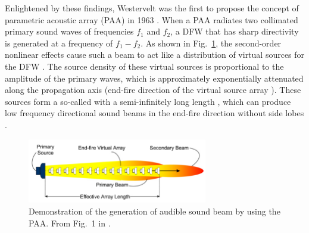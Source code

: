 Enlightened by these findings, Westervelt {was the first to propose} the concept of {parametric acoustic array} (PAA) in 1963 \cite{Westervelt1963ParametricAcousticArray}. 
When a PAA radiates two collimated primary sound waves of frequencies $f_1$ and $f_2$, a DFW that has sharp directivity is generated {at a frequency of $f_1 - f_2$}.
As shown in Fig.~\ref{fig:lr:89fjsd}, 
{the second-order nonlinear effects cause such a beam to act like a distribution of virtual sources for the DFW \cite{Westervelt1960ParametricEndFire}. 
    The source density of these virtual sources is proportional to the amplitude of the primary waves, which is approximately exponentially attenuated along the propagation axis (end-fire direction of the virtual source array \cite{Berktay1973NearfieldEffectsEndfire}).
    These sources form a so-called  with a semi-infinitely long length \cite{Gan2012ReviewParametricAcoustic}, which can produce low frequency directional sound beams in the end-fire direction without side lobes \cite{Bellin1962ExperimentalInvestigationEnd, Mellen1976NearfieldBeamPatterns, Mellen1977NearfieldAxialLevels, Tu2016RobustnessCompactEndfire}.
}

\begin{figure}[h]
    \centering
    \includegraphics[width = 0.7\textwidth]{fig/gan2012_paa_sketch_resize.png}
    \caption{Demonstration of the generation of audible sound beam by using the PAA. From Fig.~1 in \cite{Gan2012ReviewParametricAcoustic}.}
    \label{fig:lr:89fjsd}
\end{figure}

